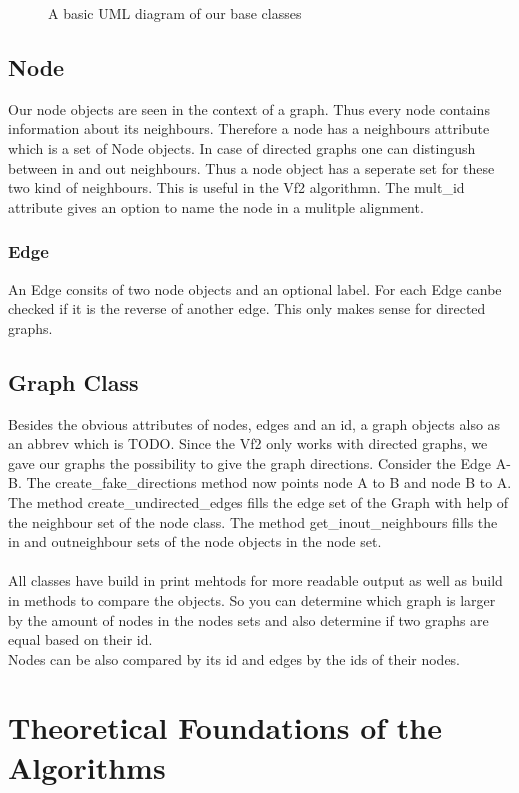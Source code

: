 \documentclass{SeminarV2}
\begin{document}
\begin{figure}
  \caption{A basic UML diagram of our base classes}
\end{figure}
\subsection{Node}
Our node objects are seen in the context of a graph. Thus every node contains information about
its neighbours. Therefore a node has a neighbours attribute which is a set of Node objects.
In case of directed graphs one can distingush between in and out neighbours. Thus a node object has a seperate set for these two kind of neighbours. This is useful in the Vf2 algorithmn. The mult\_id attribute gives an option to name the node in a mulitple alignment.
\subsubsection{Edge}
An Edge consits of two node objects and an optional label. For each Edge canbe checked if it is the reverse of another edge. This only makes sense for directed graphs.
\subsection{Graph Class}
Besides the obvious attributes of nodes, edges and an id, a graph objects also as an
abbrev which is TODO. Since the Vf2 only works with directed graphs, we
gave our graphs the possibility to give the graph directions. Consider the Edge A-B. The
create\_fake\_directions method now points node A to B and node B to A.\\
The method create\_undirected\_edges fills the edge set of the Graph with help of the neighbour set of the node class. The method get\_inout\_neighbours fills the in and outneighbour sets of the node objects in the node set.\\\\
All classes have build in print mehtods for more readable output as well as build in
methods to compare the objects. So you can determine which graph is larger by the amount of
nodes in the nodes sets and also determine if two graphs are equal based on their id.\\
Nodes can be also compared by its id and edges by the ids of their nodes.
\section{Theoretical Foundations of the Algorithms}
\end{document}

